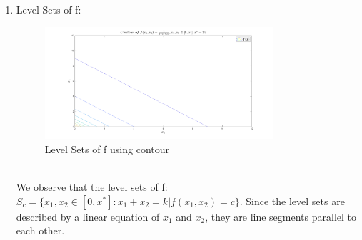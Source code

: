 \documentclass[12pt]{article}
\begin{document}
\begin{enumerate}
\begin{enumerate}
\item
Level Sets of f:\\
\begin{figure}[h!]
	\centering
	\includegraphics[width=0.8\textwidth]{6.png}
	\caption{Level Sets of f using contour}
	\label{fig:6}
\end{figure}\\
We observe that the level sets of f:\\
$S_c=\{x_1,x_2\in [0,x^{*}]:x_1+x_2=k | f(x_1,x_2)=c\}$. Since the level sets are described by a linear equation of $x_1$ and $x_2$, they are line segments parallel to each other.


\end{enumerate}
\end{enumerate}
\end{document}
